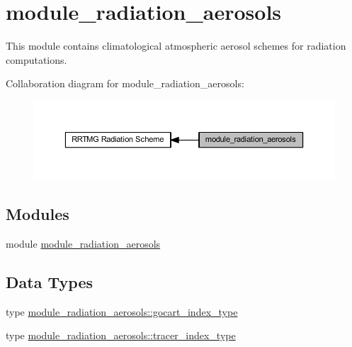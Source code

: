 \hypertarget{group__module__radiation__aerosols}{}\section{module\+\_\+radiation\+\_\+aerosols}
\label{group__module__radiation__aerosols}


This module contains climatological atmospheric aerosol schemes for radiation computations.  


Collaboration diagram for module\+\_\+radiation\+\_\+aerosols\+:\nopagebreak
\begin{figure}[H]
\begin{center}
\leavevmode
\includegraphics[width=350pt]{group__module__radiation__aerosols}
\end{center}
\end{figure}
\subsection*{Modules}
\begin{DoxyCompactItemize}
\item 
module \hyperlink{namespacemodule__radiation__aerosols}{module\+\_\+radiation\+\_\+aerosols}
\end{DoxyCompactItemize}
\subsection*{Data Types}
\begin{DoxyCompactItemize}
\item 
type \hyperlink{structmodule__radiation__aerosols_1_1gocart__index__type}{module\+\_\+radiation\+\_\+aerosols\+::gocart\+\_\+index\+\_\+type}
\item 
type \hyperlink{structmodule__radiation__aerosols_1_1tracer__index__type}{module\+\_\+radiation\+\_\+aerosols\+::tracer\+\_\+index\+\_\+type}
\end{DoxyCompactItemize}
